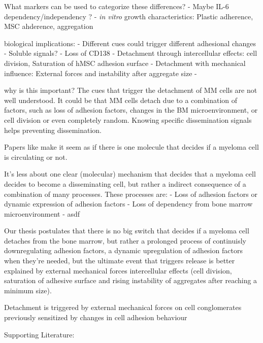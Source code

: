 What markers can be used to categorize these differences?
- Maybe IL-6 dependency/independency \cite{sprynskiRoleIGF1Major2009}?
- \textit{in vitro} growth characteristics: Plastic adherence, MSC ahderence, aggregation

\unnsubsection{\caddtriggertitle}%
\label{sec:discussion_caddtrigger}%

biological implications:
- Different cues could trigger different adhesional changes
- Soluble signals?
- Loss of CD138 \cite{akhmetzyanovaDynamicCD138Surface2020}
- Detachment through intercellular effects: cell division, Saturation of hMSC adhesion surface
- Detachment with mechanical influence: External forces and instability after aggregate size
-


why is this important?
The cues that trigger the detachment of MM cells are not well understood. It
could be that MM cells detach due to a combination of factors, such as loss of
adhesion factors, changes in the BM microenvironment, or cell division or
even completely random. Knowing specific dissemination signals helps preventing
dissemination.


Papers like \citet{akhmetzyanovaDynamicCD138Surface2020} make it seem as if
there is one molecule that decides if a myeloma cell is circulating or not.

It's less about one clear (molecular) mechanism that decides that a myeloma cell
decides to become a disseminating cell, but rather a indirect consequence of a
combination of many processes.
These processes are:
- Loss of adhesion factors or dynamic expression of adhesion factors
- Loss of dependency from bone marrow microenvironment
- asdf

Our thesis postulates that there is no big switch that decides if a myeloma cell
detaches from the bone marrow, but rather a prolonged process of continuisly
downregulating adhesion factors, a dynamic upregulation of adhesion factors when
they're needed, but the ultimate event that triggers release is better
explained by external mechanical forces intercellular effects (cell division,
saturation of adhesive surface and rising instability of aggregates after
reaching a minimum size).

Detachment is triggered by external mechanical forces on cell
conglomerates previously sensitized by changes in cell adhesion behaviour

Supporting Literature:

